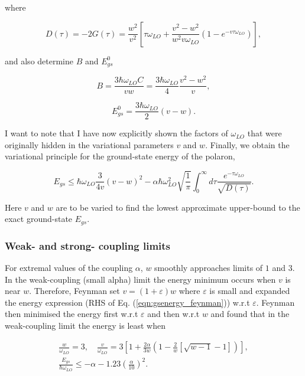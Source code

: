 where

\begin{equation}\label{eqn:FD}
    D(\tau) = -2 G(\tau) = \frac{w^2}{v^2} \left[\tau \omega_{LO} + \frac{v^2-w^2}{w^2 v \omega_{LO}} \left(1-e^{-v\tau\omega_{LO}} \right)\right],
\end{equation}

and also determine $B$ and $E^0_{gs}$

\begin{equation}
    B = \frac{3\hbar\omega_{LO} C}{v w} = \frac{3\hbar\omega_{LO}}{4} \frac{v^2-w^2}{v},
\end{equation}

\begin{equation}
    E^0_{gs} = \frac{3 \hbar \omega_{LO}}{2}(v - w).
\end{equation}

I want to note that I have now explicitly shown the factors of $\omega_{LO}$ that were originally hidden in the variational parameters $v$ and $w$. Finally, we obtain the variational principle for the ground-state energy of the polaron,

\begin{equation}
    \label{eqn:gsenergy_feynman}
    E_{gs} \leq \hbar \omega_{LO}\frac{3}{4 v} \left(v-w\right)^2 - \alpha\hbar\omega^2_{LO}\sqrt{\frac{1}{\pi}}\int^{\infty}_0 d\tau \frac{e^{-\tau \omega_{LO}}}{\sqrt{ D(\tau)}}.
\end{equation}

Here $v$ and $w$ are to be varied to find the lowest approximate upper-bound to the exact ground-state $E_{gs}$. 

\subsubsection{Weak- and strong- coupling limits}
\label{subsubsec:2-2-2-1}

For extremal values of the coupling $\alpha$, $w$ smoothly approaches limits of $1$ and $3$. In the weak-coupling (small alpha) limit the energy minimum occurs when $v$ is near $w$. Therefore, Feynman set $v = (1 + \varepsilon) w$ where $\varepsilon$ is small and expanded the energy expression (RHS of Eq. (\ref{eqn:gsenergy_feynman})) w.r.t $\varepsilon$. Feynman then minimised the energy first w.r.t $\varepsilon$ and then w.r.t $w$ and found that in the weak-coupling limit the energy is least when

\begin{equation}
\begin{gathered}
    \label{eqn:weak_gs_feynman}
    \frac{w}{\omega_{LO}} = 3, \quad \frac{v}{\omega_{LO}} = 3 \left[ 1 + \frac{2\alpha}{3w} \left(1 -\frac{2}{w} \left[ \sqrt{w-1}-1 \right] \right) \right] ,\\
    \frac{E_{gs}}{\hbar\omega_{LO}} \leq -\alpha - 1.23 \left(\frac{\alpha}{10}\right)^2 .
\end{gathered}
\end{equation}


